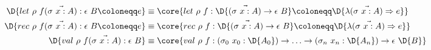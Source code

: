 \begin{description}[itemindent=0pt,left=0pt]
	\item[For the top-level]
		\begin{align*}
			\D{let\ \rho\ f(\vec{\sigma\ x : A}) : \epsilon\ B \coloneqq e} & \equiv \core{let\ \rho\ f : \D{\vec{(\sigma\ x : A)} \to \epsilon\ B} \coloneqq \D{\lambda(\vec{\sigma\ x : A}) \Rightarrow e}} \\
			\D{rec\ \rho\ f(\vec{\sigma\ x : A}) : \epsilon\ B \coloneqq e} & \equiv \core{rec\ \rho\ f : \D{\vec{(\sigma\ x : A)} \to \epsilon\ B} \coloneqq \D{\lambda(\vec{\sigma\ x : A}) \Rightarrow e}} \\
			\D{val\ \rho\ f(\vec{\sigma\ x : A}) : \epsilon\ B}             & \equiv \core{val\ \rho\ f : (\sigma_0\ x_0 : \D{A_0}) \to \ldots \to (\sigma_n\ x_n : \D{A_n}) \to \epsilon\ \D{B}}             \\
		\end{align*}
\end{description}

\let\D\undefined



\endgroup
